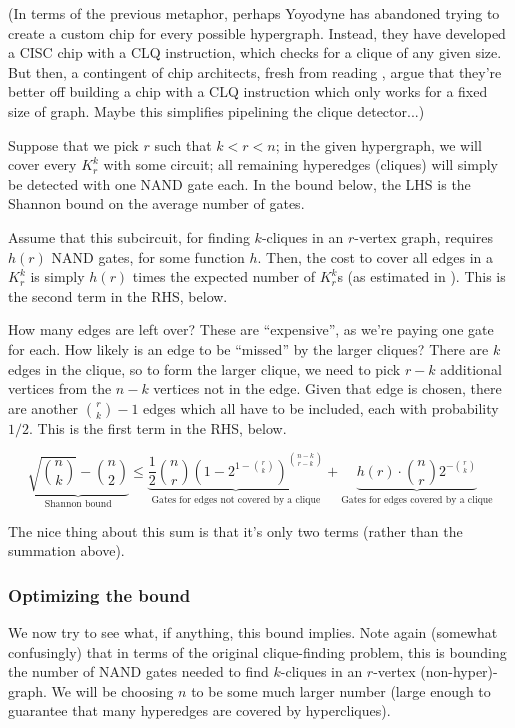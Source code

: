 \documentclass[12pt]{article}
\theoremstyle{definition}
\begin{document}
(In terms of the previous metaphor, perhaps Yoyodyne has abandoned trying to
create a custom chip for every possible hypergraph. Instead, they have
developed a CISC chip
with a CLQ instruction, which checks for a clique
of any given size. But then, a contingent of chip architects, fresh from
reading \cite{hennessy2011computer}, argue that they're better off building
a chip with a CLQ instruction which only works for a fixed size of graph.
Maybe this simplifies pipelining the clique detector...)

Suppose that we pick $r$ such that $k < r < n$; in the given hypergraph,
we will cover every $K_r^k$ with some circuit; all remaining hyperedges
(cliques) will simply be detected with one NAND gate each.
In the bound below,
the LHS is the Shannon bound on the average number
of gates.

Assume that this subcircuit, for finding $k$-cliques in an $r$-vertex graph,
requires $h(r)$ NAND gates, for some
function $h$. Then,
the cost to cover all edges in a $K_r^k$ is simply $h(r)$ times the
expected number of $K_r^k$s (as estimated in \cite{bollobas1976cliques}).
This is the second term in the RHS, below.

How many edges are left over? These are ``expensive'', as we're
paying one gate for each. How likely is an edge to be ``missed''
by the larger cliques? There are $k$ edges in the clique, so to form
the larger clique, we need to pick $r-k$ additional vertices from
the $n-k$ vertices not in the edge. Given that edge is chosen, there
are another ${r \choose k} - 1$ edges which all have to be included,
each with probability $1/2$.
This is the first term in the RHS, below.

\[
\underbrace{\sqrt{n \choose k} - {n \choose 2}}_\text{Shannon bound}
\le
\underbrace{\frac{1}{2} {n \choose r} (1 - 2^{1-{r \choose k}}) ^ {n-k \choose r-k}}
_\text{Gates for edges not covered by a clique}
   + \underbrace{h(r) \cdot {n \choose r} 2^{-{r \choose k}}}
_\text{Gates for edges covered by a clique}
\]

The nice thing about this sum is that it's only two terms (rather than
the summation above).

\subsubsection{Optimizing the bound}

We now try to see what, if anything, this bound implies. Note again
(somewhat confusingly) that in terms of the original clique-finding problem,
this is bounding the number of NAND gates needed to find $k$-cliques in an
$r$-vertex (non-hyper)-graph. We will be choosing $n$ to be some much larger
number (large enough to guarantee that many hyperedges are covered by
hypercliques).
\end{document}
